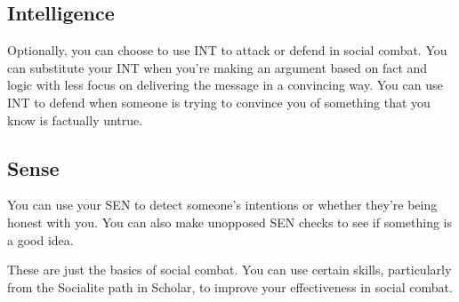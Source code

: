 \begin{multicols}{2}
\subsection{Intelligence}
Optionally, you can choose to use INT to attack or defend in social combat. You can substitute your INT when you're making an argument based on fact and logic with less focus on delivering the message in a convincing way. You can use INT to defend when someone is trying to convince you of something that you know is factually untrue.

\subsection{Sense}
You can use your SEN to detect someone's intentions or whether they're being honest with you. You can also make unopposed SEN checks to see if something is a good idea.

These are just the basics of social combat. You can use certain skills, particularly from the Socialite path in Scholar, to improve your effectiveness in social combat.

\end{multicols}